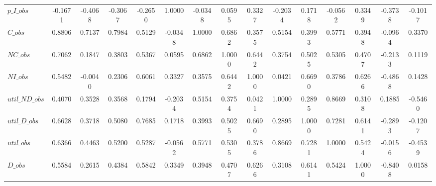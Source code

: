 \begin{center}
\begin{longtable}{lcccccccccccccc}
$p\_I\_obs      $	 & 	          -0.1671	 & 	          -0.4068	 & 	          -0.3067	 & 	          -0.2650	 & 	           1.0000	 & 	          -0.0348	 & 	           0.0595	 & 	           0.3327	 & 	          -0.2034	 & 	           0.1718	 & 	          -0.0562	 & 	           0.3349	 & 	          -0.3738	 & 	          -0.1017 \\ 
$C\_obs         $	 & 	           0.8806	 & 	           0.7137	 & 	           0.7984	 & 	           0.5129	 & 	          -0.0348	 & 	           1.0000	 & 	           0.6862	 & 	           0.3575	 & 	           0.5154	 & 	           0.3993	 & 	           0.5771	 & 	           0.3948	 & 	          -0.0964	 & 	           0.3370 \\ 
$NC\_obs        $	 & 	           0.7062	 & 	           0.1847	 & 	           0.3803	 & 	           0.5367	 & 	           0.0595	 & 	           0.6862	 & 	           1.0000	 & 	           0.6442	 & 	           0.3754	 & 	           0.5025	 & 	           0.5305	 & 	           0.4707	 & 	          -0.2133	 & 	           0.1119 \\ 
$NI\_obs        $	 & 	           0.5482	 & 	          -0.0040	 & 	           0.2306	 & 	           0.6061	 & 	           0.3327	 & 	           0.3575	 & 	           0.6442	 & 	           1.0000	 & 	           0.0421	 & 	           0.6690	 & 	           0.3786	 & 	           0.6266	 & 	          -0.4868	 & 	           0.1428 \\ 
$util\_ND\_obs  $	 & 	           0.4070	 & 	           0.3528	 & 	           0.3568	 & 	           0.1794	 & 	          -0.2034	 & 	           0.5154	 & 	           0.3754	 & 	           0.0421	 & 	           1.0000	 & 	           0.2895	 & 	           0.8669	 & 	           0.3108	 & 	           0.1885	 & 	          -0.5460 \\ 
$util\_D\_obs   $	 & 	           0.6628	 & 	           0.3718	 & 	           0.5080	 & 	           0.7685	 & 	           0.1718	 & 	           0.3993	 & 	           0.5025	 & 	           0.6690	 & 	           0.2895	 & 	           1.0000	 & 	           0.7281	 & 	           0.6141	 & 	          -0.2893	 & 	          -0.1207 \\ 
$util\_obs      $	 & 	           0.6366	 & 	           0.4463	 & 	           0.5200	 & 	           0.5287	 & 	          -0.0562	 & 	           0.5771	 & 	           0.5305	 & 	           0.3786	 & 	           0.8669	 & 	           0.7281	 & 	           1.0000	 & 	           0.5424	 & 	          -0.0156	 & 	          -0.4539 \\ 
$D\_obs         $	 & 	           0.5584	 & 	           0.2615	 & 	           0.4384	 & 	           0.5842	 & 	           0.3349	 & 	           0.3948	 & 	           0.4707	 & 	           0.6266	 & 	           0.3108	 & 	           0.6141	 & 	           0.5424	 & 	           1.0000	 & 	          -0.8408	 & 	           0.0158 \\ 

\end{longtable}
\end{center}
